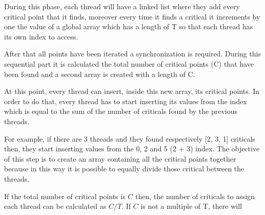 \documentclass{report}
\begin{document}
\begin{minipage}[b]{0.48\textwidth}
    During this phase, each thread will have a linked list where they add every critical point that it finds, moreover every time it finds a critical it increments by one the value of a global array which has a length of T so that each thread has its own index to access.

    After that all points have been iterated a synchronization is required. During this sequential part it is calculated the total number of critical points (C) that have been found and a second array is created with a length of C.

    At this point, every thread can insert, inside this new array, its critical points. In order to do that, every thread has to start inserting its values from the index which is equal to the sum of the number of criticals found by the previous threads.

    For example, if there are 3 threads and they found respectively [2, 3, 1] criticals then, they start inserting values from the 0, 2 and 5 (2 + 3) index. The objective of this step is to create an array containing all the critical points together because in this way it is possible to equally divide those critical between the threads. 

    If the total number of critical points is $C$ then, the number of criticals to assign each thread can be calculated as $C / T$. If $C$ is not a multiple of T, there will
\end{minipage}

\newpage
\end{document}
